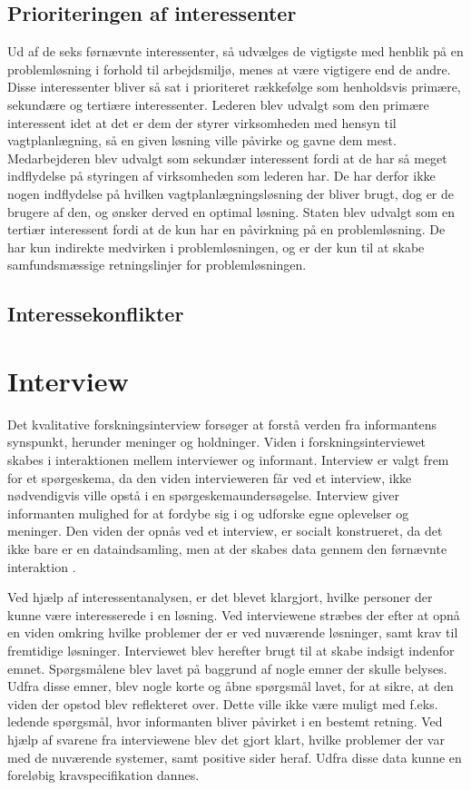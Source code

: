\subsection{Prioriteringen af interessenter}
Ud af de seks førnævnte interessenter, så udvælges de vigtigste med henblik på en problemløsning i forhold til arbejdsmiljø, menes at være vigtigere end de andre. Disse interessenter bliver så sat i prioriteret rækkefølge som henholdsvis primære, sekundære og tertiære interessenter. Lederen blev udvalgt som den primære interessent idet at det er dem der styrer virksomheden med hensyn til vagtplanlægning, så en given løsning ville påvirke og gavne dem mest. Medarbejderen blev udvalgt som sekundær interessent fordi at de har så meget indflydelse på styringen af virksomheden som lederen har. De har derfor ikke nogen indflydelse på hvilken vagtplanlægningsløsning der bliver brugt, dog er de brugere af den, og ønsker derved en optimal løsning.
Staten blev udvalgt som en tertiær interessent fordi at de kun har en påvirkning på en problemløsning. De har kun indirekte medvirken i problemløsningen, og er der kun til at skabe samfundsmæssige retningslinjer for problemløsningen. 


\subsection{Interessekonflikter}


\section{Interview}
Det kvalitative forskningsinterview forsøger at forstå verden fra informantens synspunkt, herunder meninger og holdninger. Viden i forskningsinterviewet skabes i interaktionen mellem interviewer og informant. Interview er valgt frem for et spørgeskema, da den viden intervieweren får ved et interview, ikke nødvendigvis ville opstå i en spørgeskemaundersøgelse. Interview giver informanten mulighed for at fordybe sig i og udforske egne oplevelser og meninger. Den viden der opnås ved et interview, er socialt konstrueret, da det ikke bare er en dataindsamling, men at der skabes data gennem den førnævnte interaktion \citep{kvale2009}.

Ved hjælp af interessentanalysen, er det blevet klargjort, hvilke personer der kunne være interesserede i en løsning. Ved interviewene stræbes der efter at opnå en viden omkring hvilke problemer der er ved nuværende løsninger, samt krav til fremtidige løsninger. Interviewet blev herefter brugt til at skabe indsigt indenfor emnet. Spørgsmålene blev lavet på baggrund af nogle emner der skulle belyses. Udfra disse emner, blev nogle korte og åbne spørgsmål lavet, for at sikre, at den viden der opstod blev reflekteret over. Dette ville ikke være muligt med f.eks. ledende spørgsmål, hvor informanten bliver påvirket i en bestemt retning. Ved hjælp af svarene fra interviewene blev det gjort klart, hvilke problemer der var med de nuværende systemer, samt positive sider heraf. Udfra disse data kunne en foreløbig kravspecifikation dannes.
\\

